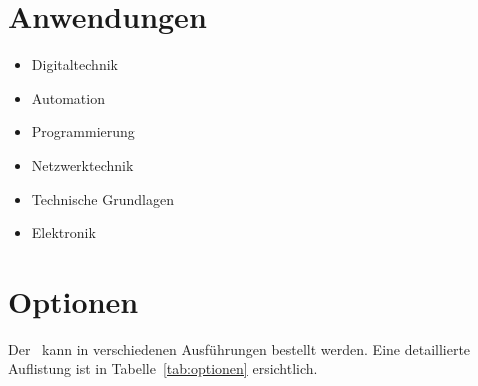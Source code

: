 \documentclass[10pt]{datasheet}
\begin{document}
\section{Anwendungen}

\begin{itemize}
    \item Digitaltechnik
    \item Automation
    \item Programmierung
    \item Netzwerktechnik
    \item Technische Grundlagen
    \item Elektronik
\end{itemize}

\vfill\break


\onecolumn

\section{Optionen}
Der \xlhPlattformID\ kann in verschiedenen Ausführungen bestellt werden.
Eine detaillierte Auflistung ist in Tabelle~\ref{tab:optionen} ersichtlich.
\end{document}
